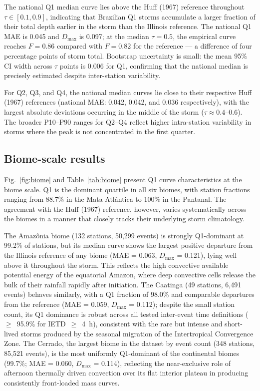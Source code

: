 \documentclass[a4paper,fleqn]{cas-sc}
\begin{document}
The national Q1 median curve lies above the Huff (1967) reference
throughout $\tau \in [0.1, 0.9]$, indicating that Brazilian Q1
storms accumulate a larger fraction of their total depth earlier in
the storm than the Illinois reference. The national Q1 MAE is 0.045
and $D_\mathrm{max}$ is 0.097; at the median $\tau = 0.5$, the
empirical curve reaches $F = 0.86$ compared with $F = 0.82$ for the
reference — a difference of four percentage points of storm total.
Bootstrap uncertainty is small: the mean 95\% CI width across
$\tau$ points is 0.006 for Q1, confirming that the national median
is precisely estimated despite inter-station variability.

For Q2, Q3, and Q4, the national median curves lie close to their
respective Huff (1967) references (national MAE: 0.042, 0.042, and
0.036 respectively), with the largest absolute deviations occurring
in the middle of the storm ($\tau \approx 0.4$–$0.6$). The broader
P10–P90 ranges for Q2–Q4 reflect higher intra-station variability in
storms where the peak is not concentrated in the first quarter.

\subsection{Biome-scale results}
\label{sec:biome}

Fig.~\ref{fig:biome} and Table~\ref{tab:biome} present Q1 curve
characteristics at the biome scale. Q1 is the dominant quartile in
all six biomes, with station fractions ranging from 88.7\% in the
Mata Atlântica to 100\% in the Pantanal. The agreement with the Huff
(1967) reference, however, varies systematically across the biomes
in a manner that closely tracks their underlying storm climatology.

The Amazônia biome (132 stations, 50,299 events) is strongly
Q1-dominant at 99.2\% of stations, but its median curve shows the
largest positive departure from the Illinois reference of any biome
(MAE = 0.063, $D_\mathrm{max}$ = 0.121), lying well above it
throughout the storm. This reflects the high convective available
potential energy of the equatorial Amazon, where deep convective
cells release the bulk of their rainfall rapidly after initiation.
The Caatinga (49 stations, 6,491 events) behaves similarly, with a
Q1 fraction of 98.0\% and comparable departures from the reference
(MAE = 0.059, $D_\mathrm{max}$ = 0.112); despite the small station
count, its Q1 dominance is robust across all tested inter-event time
definitions ($\geq$~95.9\% for IETD~$\geq$~4~h), consistent with the
rare but intense and short-lived storms produced by the seasonal
migration of the Intertropical Convergence Zone. The Cerrado,
the largest biome in the dataset by event count (348 stations,
85,521 events), is the most uniformly Q1-dominant of the continental
biomes (99.7\%; MAE = 0.060, $D_\mathrm{max}$ = 0.114), reflecting
the near-exclusive role of afternoon thermally driven convection over
its flat interior plateau in producing consistently front-loaded mass
curves.
\end{document}
